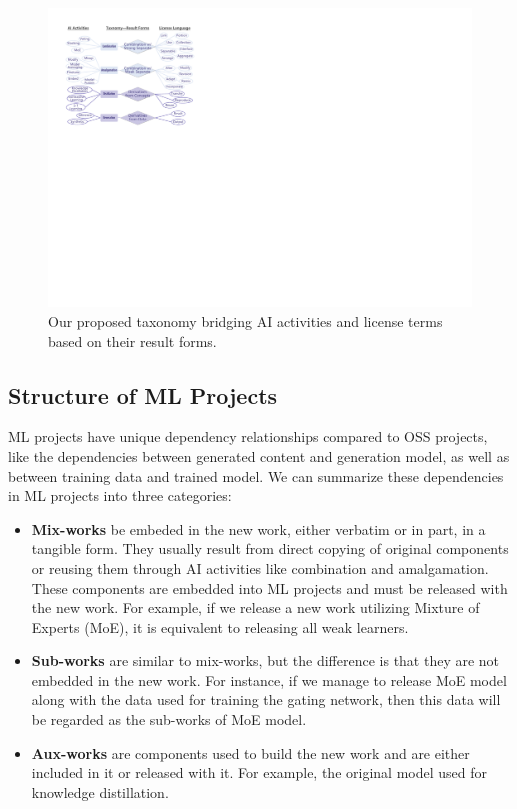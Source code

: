 \begin{figure}[t]
    \centering
    \includegraphics[width=\linewidth]{fig/taxonomy.pdf}
    \caption{Our proposed taxonomy bridging AI activities and license terms based on their result forms.}
    \Description{}
    \label{fig:tax}
\end{figure}


\subsection{Structure of ML Projects}
ML projects have unique dependency relationships compared to OSS projects, like the dependencies between generated content and generation model, as well as between training data and trained model.
We can summarize these dependencies in ML projects into three categories:
\begin{itemize}
    \item \textbf{Mix-works} be embeded in the new work, either verbatim or in part, in a tangible form.
    They usually result from direct copying of original components or reusing them through AI activities like combination and amalgamation. These components are embedded into ML projects and must be released with the new work. 
    For example, if we release a new work utilizing Mixture of Experts (MoE), it is equivalent to releasing all weak learners.

    \item \textbf{Sub-works} are similar to mix-works, but the difference is that they are not embedded in the new work. For instance, if we manage to release MoE model along with the data used for training the gating network, then this data will be regarded as the sub-works of MoE model.
    
    \item \textbf{Aux-works} are components used to build the new work and are either included in it or released with it. For example, the original model used for knowledge distillation.
\end{itemize}

